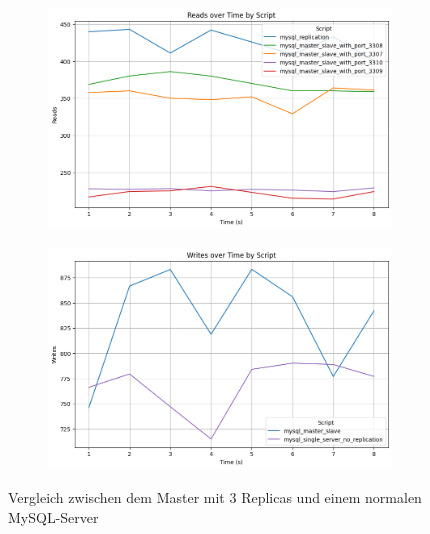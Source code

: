 \vspace{-8pt}
\begin{figure}[H]
  \centering
  \begin{subfigure}[t]{0.48\textwidth}
    \centering
    \includegraphics[width=\textwidth]{PNGs/Script/Replication/replication-vs-no/Reads}
  \end{subfigure}
  \hfill
  \begin{subfigure}[t]{0.48\textwidth}
    \centering
    \includegraphics[width=\textwidth]{PNGs/Script/Replication/replication-vs-no/Writes}
    \label{replication-vs-no-writes}
  \end{subfigure}
  \vspace{-20pt}
  \caption[Replikation: Master-Replica-Ansatz vs Single-Server]{Vergleich zwischen dem Master mit 3 Replicas und einem normalen MySQL-Server }
\end{figure}
\vspace{-20pt}

